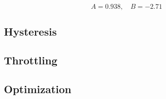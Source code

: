 \begin{equation}
A =  0.938 ,  \quad B = -2.71
\end{equation}


\subsection{Hysteresis}

\subsection{Throttling}

\subsection{Optimization}
